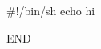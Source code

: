 \documentclass[11pt,a4paper,oneside]{book}
\begin{document}
\begin{code}

#!/bin/sh
echo hi
\end{code}
END
\end{document}
